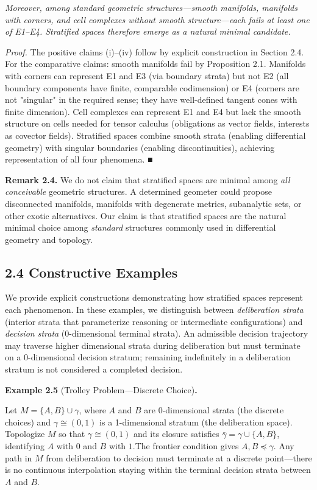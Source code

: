 \documentclass[12pt]{article}
\theoremstyle{plain}
\theoremstyle{definition}
\theoremstyle{remark}
\begin{document}
\emph{Moreover, among standard geometric structures---smooth manifolds,
manifolds with corners, and cell complexes without smooth
structure---each fails at least one of E1--E4. Stratified spaces
therefore emerge as a natural minimal candidate.}

\emph{Proof.} The positive claims (i)--(iv) follow by explicit
construction in Section 2.4. For the comparative claims: smooth
manifolds fail by Proposition 2.1. Manifolds with corners can represent
E1 and E3 (via boundary strata) but not E2 (all boundary components have
finite, comparable codimension) or E4 (corners are not "singular" in the
required sense; they have well-defined tangent cones with finite
dimension). Cell complexes can represent E1 and E4 but lack the smooth
structure on cells needed for tensor calculus (obligations as vector
fields, interests as covector fields). Stratified spaces combine smooth
strata (enabling differential geometry) with singular boundaries
(enabling discontinuities), achieving representation of all four
phenomena. ■

\textbf{Remark 2.4.} We do not claim that stratified spaces are minimal
among \emph{all conceivable} geometric structures. A determined geometer
could propose disconnected manifolds, manifolds with degenerate metrics,
subanalytic sets, or other exotic alternatives. Our claim is that
stratified spaces are the natural minimal choice among \emph{standard}
structures commonly used in differential geometry and topology.

\subsection{2.4 Constructive Examples}\label{constructive-examples}

We provide explicit constructions demonstrating how stratified spaces
represent each phenomenon. In these examples, we distinguish between
\emph{deliberation strata} (interior strata that parameterize reasoning
or intermediate configurations) and \emph{decision strata}
(0-dimensional terminal strata). An admissible decision trajectory may
traverse higher dimensional strata during deliberation but must
terminate on a 0-dimensional decision stratum; remaining indefinitely in
a deliberation stratum is not considered a completed decision.

\textbf{Example 2.5} (Trolley Problem---Discrete Choice)\textbf{.}

Let \(M = \{ A,B\} \cup \gamma\), where \(A\) and \(B\) are
0-dimensional strata (the discrete choices) and \(\gamma \cong (0,1)\)
is a 1-dimensional stratum (the deliberation space). Topologize \(M\) so
that \(\gamma \cong (0,1)\) and its closure satisfies
\(\bar{\gamma} = \gamma \cup \{ A,B\}\), identifying \(A\) with \(0\)
and \(B\) with \(1\).The frontier condition gives
\(A,B \preceq \gamma\). Any path in \(M\) from deliberation to decision
must terminate at a discrete point---there is no continuous
interpolation staying within the terminal decision strata between \(A\)
and \(B\).
\end{document}
